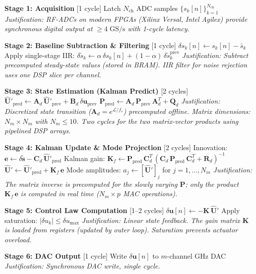 \documentclass[12pt,twocolumn]{article}
\newcommand{\uu}{\mathbf{U}}
\newcommand{\kk}{\mathbf{K}}
\newcommand{\Lop}{\mathcal{L}}
\begin{document}
\begin{algorithm}[h]
\caption{FPGA Real-Time Feedback Pipeline}
\label{alg:pipeline}
\begin{algorithmic}[1]
\Statex \textbf{Stage 1: Acquisition} [1 cycle]
\State Latch $N_{\mathrm{ch}}$ ADC samples $\{s_k[n]\}_{k=1}^{N_{\mathrm{ch}}}$
\Statex \textit{Justification: RF-ADCs on modern FPGAs (Xilinx Versal,}
\Statex \textit{Intel Agilex) provide synchronous digital output at}
\Statex \textit{$\geq 4\;\mathrm{GS/s}$ with 1-cycle latency.}

\Statex
\Statex \textbf{Stage 2: Baseline Subtraction \& Filtering} [1 cycle]
\State $\delta s_k[n] \gets s_k[n] - \bar{s}_k$ 
\State Apply single-stage IIR: $\delta\tilde{s}_k \gets \alpha\,\delta s_k[n] + (1-\alpha)\,\delta\tilde{s}_k^{\mathrm{prev}}$
\Statex \textit{Justification: Subtract precomputed steady-state values}
\Statex \textit{(stored in BRAM). IIR filter for noise rejection uses}
\Statex \textit{one DSP slice per channel.}

\Statex
\Statex \textbf{Stage 3: State Estimation (Kalman Predict)} [2 cycles]
\State $\hat{\uu}'_{\mathrm{pred}} \gets \mathbf{A}_d\,\hat{\uu}'_{\mathrm{prev}} + \mathbf{B}_d\,\delta\bm{u}_{\mathrm{prev}}$
\State $\mathbf{P}_{\mathrm{pred}} \gets \mathbf{A}_d\,\mathbf{P}_{\mathrm{prev}}\,\mathbf{A}_d^T + \mathbf{Q}_d$
\Statex \textit{Justification: Discretized state transition ($\mathbf{A}_d = e^{\Lop/f_s}$)}
\Statex \textit{precomputed offline. Matrix dimensions: $N_m \times N_m$}
\Statex \textit{with $N_m \leq 10$. Two cycles for the two matrix-vector}
\Statex \textit{products using pipelined DSP arrays.}

\Statex
\Statex \textbf{Stage 4: Kalman Update \& Mode Projection} [2 cycles]
\State Innovation: $\bm{e} \gets \delta\tilde{\bm{s}} - \mathbf{C}_d\,\hat{\uu}'_{\mathrm{pred}}$
\State Kalman gain: $\mathbf{K}_f \gets \mathbf{P}_{\mathrm{pred}}\,\mathbf{C}_d^T\,(\mathbf{C}_d\,\mathbf{P}_{\mathrm{pred}}\,\mathbf{C}_d^T + \mathbf{R}_d)^{-1}$
\State $\hat{\uu}' \gets \hat{\uu}'_{\mathrm{pred}} + \mathbf{K}_f\,\bm{e}$
\State Mode amplitudes: $a_j \gets [\hat{\uu}']_j$ for $j = 1,\ldots,N_m$
\Statex \textit{Justification: The matrix inverse is precomputed for the}
\Statex \textit{slowly varying $\mathbf{P}$; only the product $\mathbf{K}_f\,\bm{e}$}
\Statex \textit{is computed in real time ($N_m \times p$ MAC operations).}

\Statex
\Statex \textbf{Stage 5: Control Law Computation} [1--2 cycles]
\State $\delta\bm{u}[n] \gets -\kk\,\hat{\uu}'$ 
\State Apply saturation: $|\delta u_k| \leq \delta u_{\max}$
\Statex \textit{Justification: Linear state feedback. The gain matrix $\kk$}
\Statex \textit{is loaded from registers (updated by outer loop).}
\Statex \textit{Saturation prevents actuator overload.}

\Statex
\Statex \textbf{Stage 6: DAC Output} [1 cycle]
\State Write $\delta\bm{u}[n]$ to $m$-channel GHz DAC
\Statex \textit{Justification: Synchronous DAC write, single cycle.}
\end{algorithmic}
\end{algorithm}
\end{document}
